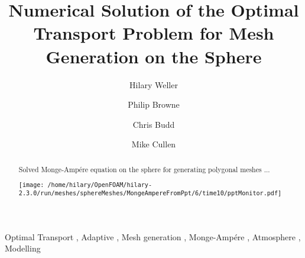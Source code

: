 \begin{frontmatter}

\title{Numerical Solution of the Optimal Transport Problem for Mesh Generation on the Sphere}

\author[label1]{Hilary Weller}
\author[label1]{Philip Browne}
\author[label2]{Chris Budd}
\author[label3]{Mike Cullen}
\address[label1]{Meteorology, University of Reading, UK}
\address[label2]{University of Bath, UK}
\address[label3]{Met Office, UK}

\begin{abstract}

Solved Monge-Amp\'ere equation on the sphere for generating polygonal meshes ... 


\texttt{[image: /home/hilary/OpenFOAM/hilary-2.3.0/run/meshes/sphereMeshes/MongeAmpereFromPpt/6/time10/pptMonitor.pdf]}

\end{abstract}

\begin{keyword}
Optimal Transport \sep
Adaptive \sep
Mesh generation \sep
Monge-Amp\'ere \sep
Atmosphere \sep
Modelling
\end{keyword}

\end{frontmatter}

